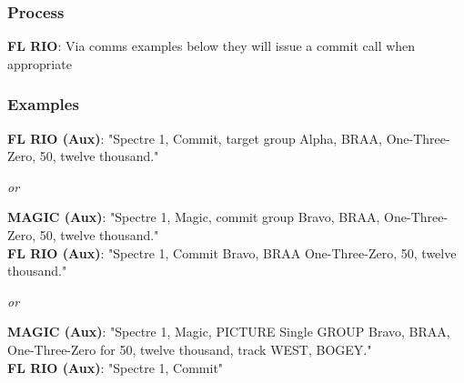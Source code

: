 \subsubsection*{Process}

\textbf{FL RIO}: Via comms examples below they will issue a commit call when
appropriate

\subsubsection*{Examples}

\textbf{FL RIO (Aux)}: "Spectre 1, Commit, target group Alpha, BRAA,
One-Three-Zero, 50, twelve thousand."

\textit{or}

\textbf{MAGIC (Aux)}: "Spectre 1, Magic, commit group Bravo, BRAA,
One-Three-Zero, 50, twelve thousand."\\
\textbf{FL RIO (Aux)}: "Spectre 1, Commit Bravo, BRAA One-Three-Zero, 50,
twelve thousand."

\textit{or}

\textbf{MAGIC (Aux)}: "Spectre 1, Magic, PICTURE Single GROUP Bravo,
BRAA, One-Three-Zero for 50, twelve thousand, track WEST, BOGEY."\\
\textbf{FL RIO (Aux)}: "Spectre 1, Commit"

